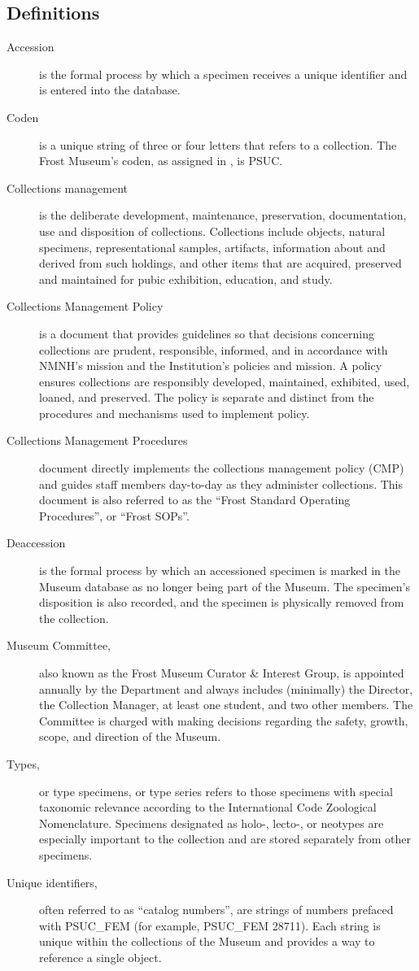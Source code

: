 \documentclass[letterpaper, 11pt]{article}
\begin{document}
\begin{appendices}
\section{Definitions}\label{app:definitions}
\begin{description}
  \item[Accession] is the formal process by which a specimen receives a unique identifier and is entered into the database.
  \item[Coden] is a unique string of three or four letters that refers to a collection. The Frost Museum's coden, as assigned in \cite{coden}, is PSUC.
  \item[Collections management] is the deliberate development, maintenance, preservation, documentation, use and disposition of collections. Collections include objects, natural specimens, representational samples, artifacts, information about and derived from such holdings, and other items that are acquired, preserved and maintained for pubic exhibition, education, and study.
  \item[Collections Management Policy] is a document that provides guidelines so that decisions concerning collections are prudent, responsible, informed, and in accordance with NMNH’s mission and the Institution’s policies and mission. A policy ensures collections are responsibly developed, maintained, exhibited, used, loaned, and preserved. The policy is separate and distinct from the procedures and mechanisms used to implement policy.
  \item[Collections Management Procedures] document directly implements the collections management policy (CMP) and guides staff members day-to-day as they administer collections. This document is also referred to as the ``Frost Standard Operating Procedures'', or ``Frost SOPs''.
  \item[Deaccession] is the formal process by which an accessioned specimen is marked in the Museum database as no longer being part of the Museum. The specimen's disposition is also recorded, and the specimen is physically removed from the collection.
  \item[Museum Committee,] also known as the Frost Museum Curator \& Interest Group, is appointed annually by the Department and always includes (minimally) the Director, the Collection Manager, at least one student, and two other members. The Committee is charged with making decisions regarding the safety, growth, scope, and direction of the Museum.
  \item[Types,] or type specimens, or type series refers to those specimens with special taxonomic relevance according to the International Code Zoological Nomenclature. Specimens designated as holo-, lecto-, or neotypes are especially important to the collection and are stored separately from other specimens.
  \item[Unique identifiers,] often referred to as ``catalog numbers'', are strings of numbers prefaced with PSUC\_FEM (for example, PSUC\_FEM 28711). Each string is unique within the collections of the Museum and provides a way to reference a single object.
\end{description}
\end{appendices}


\clearpage


\end{document}
